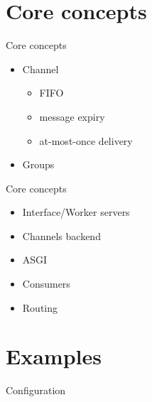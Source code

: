 \documentclass{beamer}
\begin{document}
\section{Core concepts}

\begin{frame}{Core concepts}
	\begin{adjustwidth}{2em}{2.5em}
	\begin{itemize}
		\item Channel
			\begin{itemize}
				\item FIFO
				\item message expiry
				\item at-most-once delivery
			\end{itemize}
		\item Groups
	\end{itemize}
	\end{adjustwidth}
\end{frame}

\begin{frame}{Core concepts}
	\begin{adjustwidth}{2em}{2.5em}
	\begin{itemize}
		\item Interface/Worker servers
		\item Channels backend
		\item ASGI
		\item Consumers
		\item Routing
	\end{itemize}
	\end{adjustwidth}
\end{frame}

\section{Examples}

\begin{frame}[fragile]{Configuration}
\end{frame}
\end{document}
